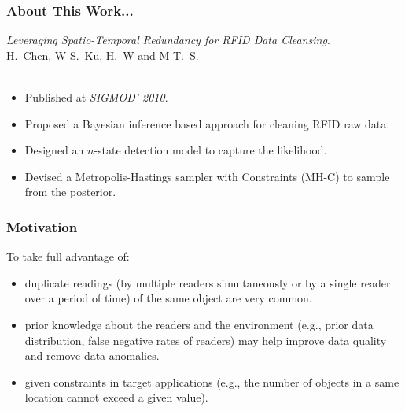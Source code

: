 \begin{frame}
\frametitle{About This Work...}

\emph{Leveraging Spatio-Temporal Redundancy for RFID Data Cleansing}.~\cite{chen2010leveraging} \\
H.~Chen, W-S.~Ku, H.~W and M-T.~S.\\~\\

\begin{itemize}
  \item Published at \emph{SIGMOD' 2010}.
  \item Proposed a Bayesian inference based approach for cleaning RFID raw data.
  \item Designed an $n$-state detection model to capture the likelihood.
  \item Devised a Metropolis-Hastings sampler with Constraints (MH-C) to sample from the posterior.
\end{itemize}

\end{frame}


\begin{frame}
\frametitle{Motivation}

To take full advantage of:

\begin{itemize}
  \item duplicate readings (by multiple readers simultaneously or by a single reader over a period of time) of the same object are very common.
  \item prior knowledge about the readers and the environment (e.g., prior data distribution, false negative rates of readers) may help improve data quality and remove data anomalies.
  \item given constraints in target applications (e.g., the number of objects in a same location cannot exceed a given value).
\end{itemize}

\end{frame}


